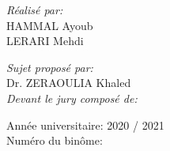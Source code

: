 \begin{titlepage}
\begin{center}
\normalsize
\begin{minipage}[t]{0.4\textwidth}
\begin{flushleft}
\large
\emph{Réalisé par:}\\
\textsc{HAMMAL} Ayoub\\
\textsc{LERARI} Mehdi
\end{flushleft}
\end{minipage}
%
\begin{minipage}[t]{0.4\textwidth}
\begin{flushright} 
\large
\emph{Sujet proposé par:}\\
Dr. \textsc{ZERAOULIA} Khaled\\[1.5cm]
\emph{Devant le jury composé de:}\\
\end{flushright}
\end{minipage}

\vfill

{\large Année universitaire: 2020 / 2021}\\
{\large Numéro du binôme: }

\end{center}
\end{titlepage}
